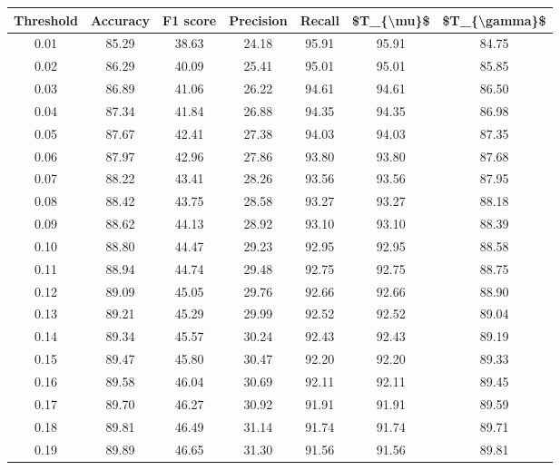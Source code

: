 \begin{tabular}{|c|c|c|c|c|c|c|}
\hline
 Threshold &  Accuracy &  F1 score &  Precision &  Recall &  \$T\_\{\textbackslash mu\}\$ &  \$T\_\{\textbackslash gamma\}\$ \\
\hline
      0.01 &     85.29 &     38.63 &      24.18 &   95.91 &      95.91 &         84.75 \\
      0.02 &     86.29 &     40.09 &      25.41 &   95.01 &      95.01 &         85.85 \\
      0.03 &     86.89 &     41.06 &      26.22 &   94.61 &      94.61 &         86.50 \\
      0.04 &     87.34 &     41.84 &      26.88 &   94.35 &      94.35 &         86.98 \\
      0.05 &     87.67 &     42.41 &      27.38 &   94.03 &      94.03 &         87.35 \\
      0.06 &     87.97 &     42.96 &      27.86 &   93.80 &      93.80 &         87.68 \\
      0.07 &     88.22 &     43.41 &      28.26 &   93.56 &      93.56 &         87.95 \\
      0.08 &     88.42 &     43.75 &      28.58 &   93.27 &      93.27 &         88.18 \\
      0.09 &     88.62 &     44.13 &      28.92 &   93.10 &      93.10 &         88.39 \\
      0.10 &     88.80 &     44.47 &      29.23 &   92.95 &      92.95 &         88.58 \\
      0.11 &     88.94 &     44.74 &      29.48 &   92.75 &      92.75 &         88.75 \\
      0.12 &     89.09 &     45.05 &      29.76 &   92.66 &      92.66 &         88.90 \\
      0.13 &     89.21 &     45.29 &      29.99 &   92.52 &      92.52 &         89.04 \\
      0.14 &     89.34 &     45.57 &      30.24 &   92.43 &      92.43 &         89.19 \\
      0.15 &     89.47 &     45.80 &      30.47 &   92.20 &      92.20 &         89.33 \\
      0.16 &     89.58 &     46.04 &      30.69 &   92.11 &      92.11 &         89.45 \\
      0.17 &     89.70 &     46.27 &      30.92 &   91.91 &      91.91 &         89.59 \\
      0.18 &     89.81 &     46.49 &      31.14 &   91.74 &      91.74 &         89.71 \\
      0.19 &     89.89 &     46.65 &      31.30 &   91.56 &      91.56 &         89.81 \\

\end{tabular}
